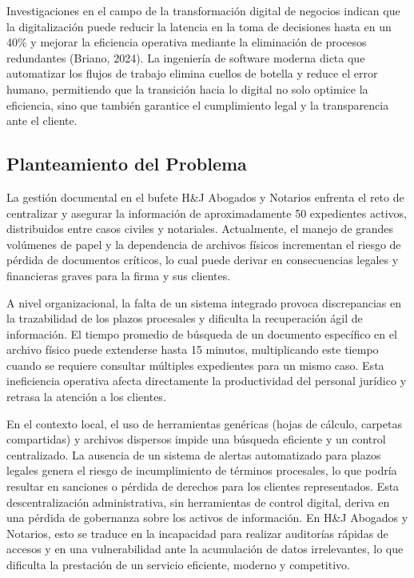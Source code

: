 \documentclass[12pt, letterpaper]{article}
\begin{document}
Investigaciones en el campo de la transformación digital de negocios indican que la digitalización puede reducir la latencia en la toma de decisiones hasta en un 40\% y mejorar la eficiencia operativa mediante la eliminación de procesos redundantes (Briano, 2024). La ingeniería de software moderna dicta que automatizar los flujos de trabajo elimina cuellos de botella y reduce el error humano, permitiendo que la transición hacia lo digital no solo optimice la eficiencia, sino que también garantice el cumplimiento legal y la transparencia ante el cliente.

\subsection{Planteamiento del Problema}
La gestión documental en el bufete H\&J Abogados y Notarios enfrenta el reto de centralizar y asegurar la información de aproximadamente 50 expedientes activos, distribuidos entre casos civiles y notariales. Actualmente, el manejo de grandes volúmenes de papel y la dependencia de archivos físicos incrementan el riesgo de pérdida de documentos críticos, lo cual puede derivar en consecuencias legales y financieras graves para la firma y sus clientes.

A nivel organizacional, la falta de un sistema integrado provoca discrepancias en la trazabilidad de los plazos procesales y dificulta la recuperación ágil de información. El tiempo promedio de búsqueda de un documento específico en el archivo físico puede extenderse hasta 15 minutos, multiplicando este tiempo cuando se requiere consultar múltiples expedientes para un mismo caso. Esta ineficiencia operativa afecta directamente la productividad del personal jurídico y retrasa la atención a los clientes.

En el contexto local, el uso de herramientas genéricas (hojas de cálculo, carpetas compartidas) y archivos dispersos impide una búsqueda eficiente y un control centralizado. La ausencia de un sistema de alertas automatizado para plazos legales genera el riesgo de incumplimiento de términos procesales, lo que podría resultar en sanciones o pérdida de derechos para los clientes representados. Esta descentralización administrativa, sin herramientas de control digital, deriva en una pérdida de gobernanza sobre los activos de información. En H\&J Abogados y Notarios, esto se traduce en la incapacidad para realizar auditorías rápidas de accesos y en una vulnerabilidad ante la acumulación de datos irrelevantes, lo que dificulta la prestación de un servicio eficiente, moderno y competitivo.
\end{document}
